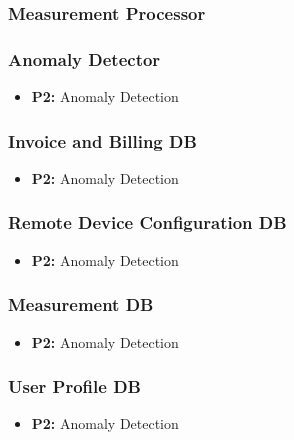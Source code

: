 \subsubsection{Measurement Processor}
\subsubsection{Anomaly Detector}
\begin{itemize}
	\item \textbf{P2:  } Anomaly Detection 
\end{itemize}
\subsubsection{Invoice and Billing DB}
\begin{itemize}
	\item \textbf{P2:  } Anomaly Detection 
\end{itemize}
\subsubsection{Remote Device Configuration DB}
\begin{itemize}
	\item \textbf{P2:  } Anomaly Detection 
\end{itemize}
\subsubsection{Measurement DB}
\begin{itemize}
	\item \textbf{P2:  } Anomaly Detection 
\end{itemize}
\subsubsection{User Profile DB}
\begin{itemize}
	\item \textbf{P2:  } Anomaly Detection 
\end{itemize}
